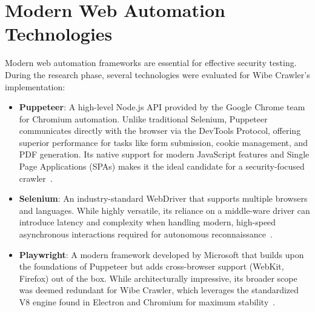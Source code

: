 \documentclass[12pt,oneside,a4paper]{book}
\begin{document}
\section{Modern Web Automation Technologies}

Modern web automation frameworks are essential for effective security testing. During the research phase, several technologies were evaluated for Wibe Crawler's implementation:

\begin{itemize}
    \item \textbf{Puppeteer}: A high-level Node.js API provided by the Google Chrome team for Chromium automation. Unlike traditional Selenium, Puppeteer communicates directly with the browser via the DevTools Protocol, offering superior performance for tasks like form submission, cookie management, and PDF generation. Its native support for modern JavaScript features and Single Page Applications (SPAs) makes it the ideal candidate for a security-focused crawler~\cite{puppeteer2025}.
    \item \textbf{Selenium}: An industry-standard WebDriver that supports multiple browsers and languages. While highly versatile, its reliance on a middle-ware driver can introduce latency and complexity when handling modern, high-speed asynchronous interactions required for autonomous reconnaissance~\cite{selenium2025}.
    \item \textbf{Playwright}: A modern framework developed by Microsoft that builds upon the foundations of Puppeteer but adds cross-browser support (WebKit, Firefox) out of the box. While architecturally impressive, its broader scope was deemed redundant for Wibe Crawler, which leverages the standardized V8 engine found in Electron and Chromium for maximum stability~\cite{playwright2025}.
\end{itemize}
\end{document}
